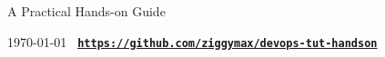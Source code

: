 \begin{titlepage}
    \begin{center}
        \vspace*{1cm}

        \Huge
        \textbf{\docTitle{}}

        \vspace{0.5cm}
        \LARGE
        A Practical Hands-on Guide

        \vspace{1cm}

        \textbf{\docAuthor{}}

        \vspace{1.5cm}

        

        \vspace{1.5cm}
        \Large
        \today
        \vfill
        \texttt{
            \small \bf \url{https://github.com/ziggymax/devops-tut-handson}
        }


    \end{center}
\end{titlepage}